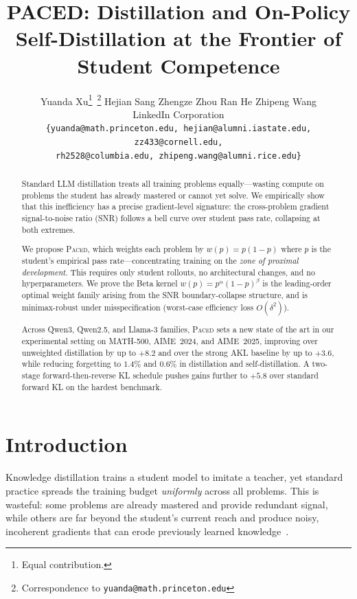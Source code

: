 \documentclass{article}
\title{PACED: Distillation and On-Policy Self-Distillation at the Frontier of Student Competence}
\author{
    Yuanda Xu\thanks{Equal contribution.}\,
    \thanks{Correspondence to \texttt{yuanda@math.princeton.edu}} \quad
    Hejian Sang\footnotemark[1] \quad
    Zhengze Zhou\footnotemark[1] \quad
    Ran He\footnotemark[1] \quad
    Zhipeng Wang \\
    LinkedIn Corporation \\
    \texttt{\{yuanda@math.princeton.edu, hejian@alumni.iastate.edu, zz433@cornell.edu,} \\
    \texttt{rh2528@columbia.edu, 
    zhipeng.wang@alumni.rice.edu\}}
}
\begin{document}
\maketitle

\begin{abstract}

Standard LLM distillation treats all training problems equally---wasting compute on problems the student has already mastered or cannot yet solve.
We empirically show that this inefficiency has a precise gradient-level signature: the cross-problem gradient signal-to-noise ratio (SNR) follows a bell curve over student pass rate, collapsing at both extremes.

We propose \textsc{Paced}, which weights each problem by $w(p) = p(1{-}p)$ where $p$ is the student's empirical pass rate---concentrating training on the \emph{zone of proximal development}.
This requires only student rollouts, no architectural changes, and no hyperparameters.
We prove the Beta kernel $w(p) = p^\alpha(1{-}p)^\beta$ is the leading-order optimal weight family arising from the SNR boundary-collapse structure, and is minimax-robust under misspecification (worst-case efficiency loss $O(\delta^2)$).

Across Qwen3, Qwen2.5, and Llama-3 families, \textsc{Paced} sets a new state of the art in our experimental setting on MATH-500, AIME~2024, and AIME~2025, improving over unweighted distillation by up to $\mathbf{+8.2}$ and over the strong AKL baseline by up to $\mathbf{+3.6}$, while reducing forgetting to $\mathbf{1.4\%}$ and $\mathbf{0.6\%}$ in distillation and self-distillation.
A two-stage forward-then-reverse KL schedule pushes gains further to $\mathbf{+5.8}$ over standard forward KL on the hardest benchmark.
\end{abstract}


\section{Introduction}
\label{sec:intro}
Knowledge distillation trains a student model to imitate a teacher, yet standard practice spreads the training budget \emph{uniformly} across all problems. This is wasteful: some problems are already mastered and provide redundant signal, while others are far beyond the student's current reach and produce noisy, incoherent gradients that can erode previously learned knowledge~\citep{french1999catastrophic, kirkpatrick2017ewc}.
\end{document}
